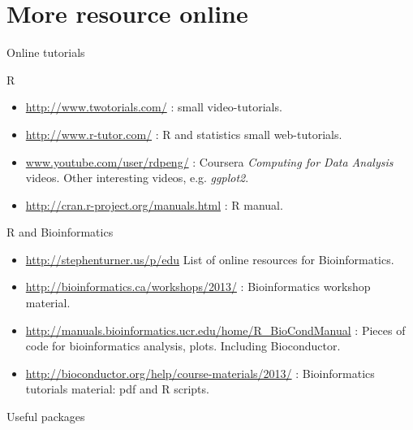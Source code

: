 \documentclass[10pt]{beamer}
\begin{document}
\section{More resource online}

\begin{frame}[shrink=10]{Online tutorials}
  \begin{block}{R}
    \begin{itemize}
    \item \url{http://www.twotorials.com/} : small video-tutorials.
    \item \url{http://www.r-tutor.com/} : R and statistics small web-tutorials.
    \item \url{www.youtube.com/user/rdpeng/} : Coursera {\it Computing for Data Analysis} videos. Other interesting videos, e.g. {\it ggplot2}.
    \item \url{http://cran.r-project.org/manuals.html} : R manual.
    \end{itemize}
  \end{block}
  \begin{block}{R and Bioinformatics}
    \begin{itemize}
    \item \url{http://stephenturner.us/p/edu} List of online resources for Bioinformatics.
    \item \url{http://bioinformatics.ca/workshops/2013/} : Bioinformatics workshop material.
    \item \url{http://manuals.bioinformatics.ucr.edu/home/R_BioCondManual} : Pieces of code for bioinformatics analysis, plots. Including Bioconductor.
    \item \url{http://bioconductor.org/help/course-materials/2013/} : Bioinformatics tutorials material: pdf and R scripts.
    \end{itemize}
  \end{block}
\end{frame}

\begin{frame}{Useful packages}
  
\end{frame}
\end{document}
